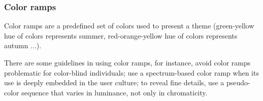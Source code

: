 \subsubsection{Color ramps}
Color ramps are a predefined set of colors used to present a theme (green-yellow hue of colors represents summer, red-orange-yellow hue of colors represents autumn ...).\par
There are some guidelines in using color ramps, for instance, avoid color ramps problematic for color-blind individuals; use a spectrum-based color ramp when its use is deeply embedded in the user culture; to reveal fine details, use a pseudo-color sequence that varies in luminance, not only in chromaticity. 